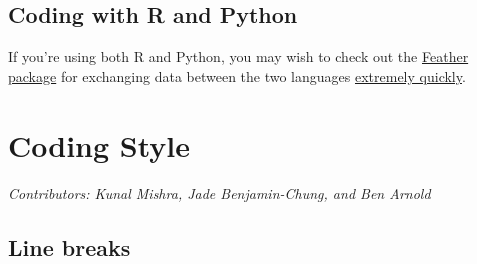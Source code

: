 \documentclass[
]{book}
\begin{document}
\hypertarget{coding-with-r-and-python}{%
\section{Coding with R and Python}\label{coding-with-r-and-python}}

If you're using both R and Python, you may wish to check out the \href{https://www.rdocumentation.org/packages/feather/versions/0.3.3}{Feather package} for exchanging data between the two languages \href{https://blog.rstudio.com/2016/03/29/feather/}{extremely quickly}.

\hypertarget{codingstyle}{%
\chapter{Coding Style}\label{codingstyle}}

\emph{Contributors: Kunal Mishra, Jade Benjamin-Chung, and Ben Arnold}

\hypertarget{line-breaks}{%
\section{Line breaks}\label{line-breaks}}
\end{document}
